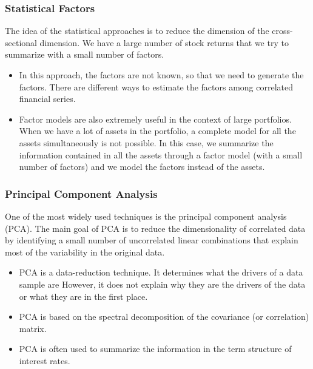 \documentclass[xcolor=dvipsnames, english, 8pt]{beamer}
\begin{document}
\begin{frame}
    \frametitle{Statistical Factors}
    The idea of the statistical approaches is to reduce the dimension of the cross-sectional
    dimension. We have a large number of stock returns that we try to summarize with a
    small number of factors.\vspace{0.25cm}\\

    \begin{itemize}
        \item In this approach, the factors are not known, so that we need to generate the factors. There are different ways to estimate the factors among correlated financial series.
        \item Factor models are also extremely useful in the context of large portfolios.
        When we have a lot of assets in the portfolio, a complete model for all the assets
        simultaneously is not possible. In this case, we summarize the information contained in
        all the assets through a factor model (with a small number of factors) and we model the
        factors instead of the assets.
    \end{itemize}
\end{frame}

\begin{frame}
    \frametitle{Principal Component Analysis}
    One of the most widely used techniques is the principal component analysis (PCA). The main goal of PCA is to reduce the dimensionality of correlated data by identifying a small number of uncorrelated linear combinations that explain most of the variability in the original data.\vspace{0.25cm}\\
    \begin{itemize}
        \item PCA is a data-reduction technique. It determines what the drivers of a data sample are
However, it does not explain why they are the drivers of the data or what they are in the first place.
        \item PCA is based on the spectral decomposition of the covariance (or correlation) matrix.
        \item PCA is often used to summarize the information in the term structure of
interest rates.
    \end{itemize}
\end{frame}
\end{document}
